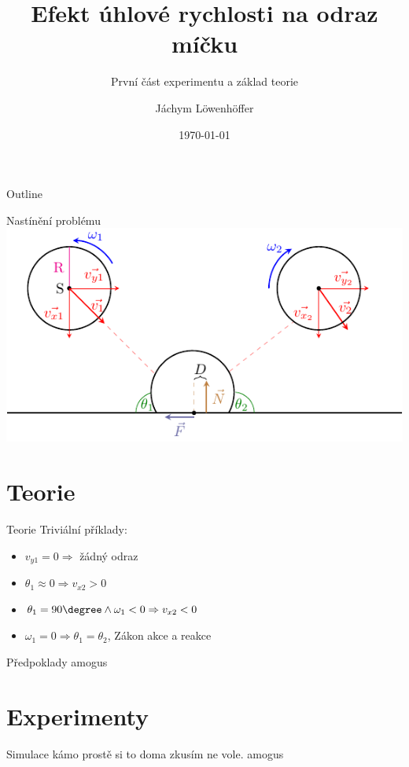 \documentclass{beamer}
\title{Efekt úhlové rychlosti na odraz míčku}
\subtitle{První část experimentu a základ teorie}
\author{Jáchym Löwenhöffer}
\institute{GEVO JM}
\date{\today}
\begin{document}
 
 \begin{frame}
  \titlepage
 \end{frame}

 \begin{frame}{Outline}
  \tableofcontents
 \end{frame}

 \begin{frame}{Nastínění problému}
  \includegraphics{diagram.pdf}
 \end{frame}

 \section{Teorie} 

\begin{frame}
 \sectionpage
\end{frame}

 \begin{frame}{Teorie}
  Triviální příklady:
  \begin{itemize}
   \item $v_{y1}=0 \Rightarrow $ žádný odraz
   \item $\theta_1\approx0 \Rightarrow v_{x2} > 0$
   \item $\theta_1=90\degree \land \omega_1<0 \Rightarrow v_{x2} < 0 $
   \item $\omega_1=0 \Rightarrow \theta_1=\theta_2 $, Zákon akce a reakce
  \end{itemize}
 \end{frame}

 \begin{frame}{Předpoklady}
 amogus
\end{frame}

\section{Experimenty}
\begin{frame}
 \sectionpage
\end{frame}

 \begin{frame}{Simulace}
 kámo prostě si to doma zkusím ne vole. amogus
\end{frame}
\end{document}
